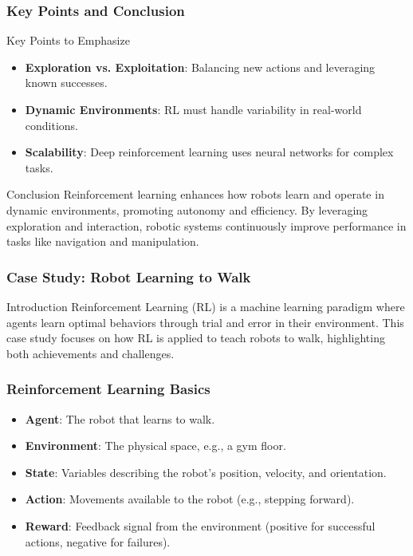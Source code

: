 \documentclass[aspectratio=169]{beamer}
\begin{document}
\begin{frame}[fragile]
    \frametitle{Key Points and Conclusion}
    \begin{block}{Key Points to Emphasize}
        \begin{itemize}
            \item \textbf{Exploration vs. Exploitation}: Balancing new actions and leveraging known successes.
            \item \textbf{Dynamic Environments}: RL must handle variability in real-world conditions.
            \item \textbf{Scalability}: Deep reinforcement learning uses neural networks for complex tasks.
        \end{itemize}
    \end{block}
    
    \begin{block}{Conclusion}
        Reinforcement learning enhances how robots learn and operate in dynamic environments, promoting autonomy and efficiency. By leveraging exploration and interaction, robotic systems continuously improve performance in tasks like navigation and manipulation.
    \end{block}
\end{frame}

\begin{frame}[fragile]
    \frametitle{Case Study: Robot Learning to Walk}
    \begin{block}{Introduction}
        Reinforcement Learning (RL) is a machine learning paradigm where agents learn optimal behaviors through trial and error in their environment. 
        This case study focuses on how RL is applied to teach robots to walk, highlighting both achievements and challenges.
    \end{block}
\end{frame}

\begin{frame}[fragile]
    \frametitle{Reinforcement Learning Basics}
    \begin{itemize}
        \item \textbf{Agent}: The robot that learns to walk.
        \item \textbf{Environment}: The physical space, e.g., a gym floor.
        \item \textbf{State}: Variables describing the robot's position, velocity, and orientation.
        \item \textbf{Action}: Movements available to the robot (e.g., stepping forward).
        \item \textbf{Reward}: Feedback signal from the environment (positive for successful actions, negative for failures).
    \end{itemize}
\end{frame}
\end{document}
